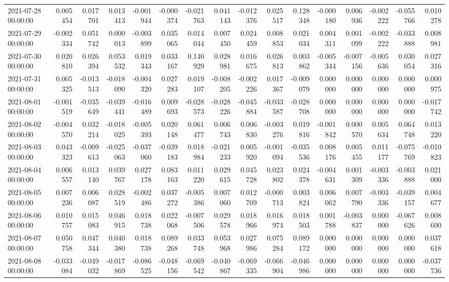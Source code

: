 \begin{tabular}{lrrrrrrrrrrrrrrr}
2021-07-28 00:00:00 & 0.005454 & 0.017701 & 0.013413 & -0.001944 & -0.000374 & -0.021763 & 0.041143 & -0.012376 & 0.025517 & 0.128348 & -0.000180 & 0.006936 & -0.002222 & -0.055766 & 0.010278 \\
2021-07-29 00:00:00 & -0.002334 & 0.051742 & 0.000013 & -0.003899 & 0.035065 & 0.014044 & 0.007450 & 0.024459 & 0.008853 & 0.021034 & 0.004311 & 0.001099 & -0.002222 & -0.033888 & 0.008981 \\
2021-07-30 00:00:00 & 0.020810 & 0.026394 & 0.053532 & 0.019343 & 0.033167 & 0.140929 & 0.028981 & 0.016675 & 0.026813 & 0.003862 & -0.005344 & -0.007156 & -0.005636 & 0.030054 & 0.027316 \\
2021-07-31 00:00:00 & 0.005325 & -0.013513 & -0.018090 & -0.004320 & 0.027283 & 0.019107 & -0.008205 & -0.002226 & 0.017367 & -0.009079 & 0.000000 & 0.000000 & 0.000000 & 0.000000 & 0.000975 \\
2021-08-01 00:00:00 & -0.001519 & -0.035649 & -0.039441 & -0.016489 & 0.009693 & -0.028573 & -0.028226 & -0.045884 & -0.033587 & -0.028708 & 0.000000 & 0.000000 & 0.000000 & 0.000000 & -0.017742 \\
2021-08-02 00:00:00 & -0.004570 & 0.032214 & -0.018025 & -0.005393 & 0.020148 & 0.061477 & 0.006743 & 0.006830 & -0.003276 & 0.019816 & -0.001842 & 0.000570 & 0.005634 & 0.064748 & 0.013220 \\
2021-08-03 00:00:00 & 0.043323 & -0.009613 & -0.025063 & -0.037060 & -0.039183 & 0.018984 & -0.021233 & 0.005920 & -0.001094 & -0.035536 & 0.008176 & 0.005455 & 0.011177 & -0.075769 & -0.010823 \\
2021-08-04 00:00:00 & 0.006557 & 0.013140 & 0.039767 & 0.027178 & 0.083163 & 0.011220 & 0.029615 & 0.045728 & 0.023802 & 0.024378 & -0.004631 & 0.001309 & -0.003336 & -0.003888 & 0.021000 \\
2021-08-05 00:00:00 & 0.007236 & 0.006087 & 0.028519 & -0.002486 & 0.037272 & -0.005386 & 0.007060 & 0.012709 & -0.000713 & 0.003824 & 0.006062 & 0.007790 & -0.003336 & -0.039157 & 0.004677 \\
2021-08-06 00:00:00 & 0.010757 & 0.015083 & 0.046915 & 0.018738 & 0.022068 & -0.007506 & 0.029578 & 0.018966 & 0.016974 & 0.018503 & 0.001788 & -0.003837 & 0.000000 & -0.067626 & 0.008600 \\
2021-08-07 00:00:00 & 0.050758 & 0.047344 & 0.040380 & 0.018738 & 0.089268 & 0.033748 & 0.053968 & 0.027986 & 0.075284 & 0.089172 & 0.000000 & 0.000000 & 0.000000 & 0.000000 & 0.037618 \\
2021-08-08 00:00:00 & -0.033084 & -0.049032 & -0.017869 & -0.086525 & -0.048156 & -0.069542 & -0.040867 & -0.069335 & -0.066904 & -0.046986 & 0.000000 & 0.000000 & 0.000000 & 0.000000 & -0.037736 \\

\end{tabular}
